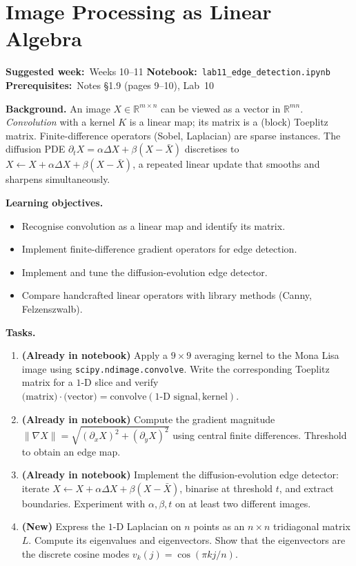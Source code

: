 \documentclass[11pt, a4paper]{article}
\newcommand{\labmeta}[3]{%
  \begin{prereqbox}
  \textbf{Suggested week:}~#1 \quad
  \textbf{Notebook:}~\texttt{#2} \quad
  \textbf{Prerequisites:}~#3
  \end{prereqbox}
  \vspace{4pt}
}
\newcommand{\objectives}[1]{%
  \textbf{\color{prereqcolor}Learning objectives.}\vspace{2pt}
  \begin{itemize}[leftmargin=1.6em, itemsep=1pt] #1 \end{itemize}
}
\newcommand{\tasks}[1]{%
  \begin{taskbox}
  \textbf{\color{taskcolor}Tasks.}
  \begin{enumerate}[leftmargin=1.6em, itemsep=3pt] #1 \end{enumerate}
  \end{taskbox}
}
\begin{document}
\section{Image Processing as Linear Algebra}
\label{lab:image}

\labmeta{Weeks 10--11}{lab11\_edge\_detection.ipynb}{Notes §1.9 (pages 9--10), Lab~10}

\vspace{4pt}

\noindent\textbf{Background.}
An image $X \in \mathbb{R}^{m\times n}$ can be viewed as a vector in $\mathbb{R}^{mn}$.
\emph{Convolution} with a kernel $K$ is a linear map; its matrix is a (block)
Toeplitz matrix.  Finite-difference operators (Sobel, Laplacian) are sparse
instances.  The diffusion PDE $\partial_t X = \alpha\Delta X + \beta(X - \bar X)$
discretises to $X \leftarrow X + \alpha\Delta X + \beta(X - \bar{X})$, a
repeated linear update that smooths and sharpens simultaneously.

\objectives{
  \item Recognise convolution as a linear map and identify its matrix.
  \item Implement finite-difference gradient operators for edge detection.
  \item Implement and tune the diffusion-evolution edge detector.
  \item Compare handcrafted linear operators with library methods (Canny, Felzenszwalb).
}

\tasks{
  \item \textbf{(Already in notebook)} Apply a $9\times 9$ averaging kernel to the
        Mona Lisa image using \texttt{scipy.ndimage.convolve}.
        Write the corresponding Toeplitz matrix for a $1$-D slice and verify
        $\text{(matrix)} \cdot \text{(vector)} = \text{convolve}(\text{1-D signal}, \text{kernel})$.
  \item \textbf{(Already in notebook)} Compute the gradient magnitude
        $\|\nabla X\| = \sqrt{(\partial_x X)^2 + (\partial_y X)^2}$
        using central finite differences.  Threshold to obtain an edge map.
  \item \textbf{(Already in notebook)} Implement the diffusion-evolution edge
        detector: iterate $X \leftarrow X + \alpha\Delta X + \beta(X - \bar X)$,
        binarise at threshold $t$, and extract boundaries.
        Experiment with $\alpha, \beta, t$ on at least two different images.
  \item \textbf{(New)} Express the $1$-D Laplacian on $n$ points as an
        $n\times n$ tridiagonal matrix $L$.  Compute its eigenvalues and eigenvectors.
        Show that the eigenvectors are the discrete cosine modes
        $v_k(j) = \cos(\pi k j / n)$.
}
\end{document}
